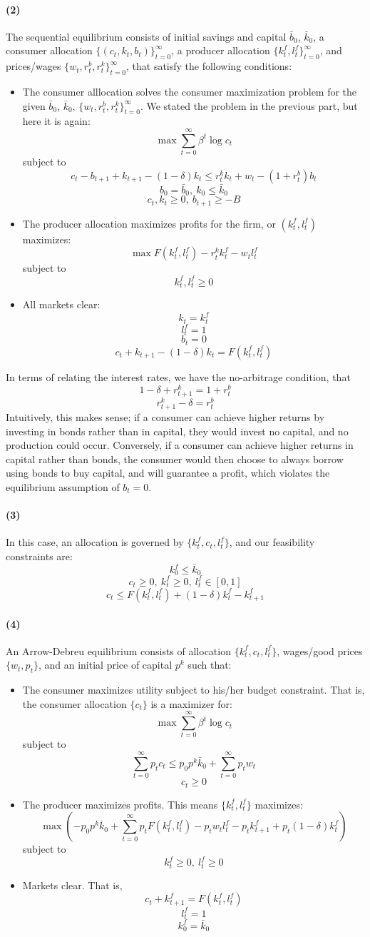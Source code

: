 \documentclass[10pt,letter]{article}
\newcommand{\problempart}[1]{\paragraph{#1}}
\begin{document}
\problempart{(2)}
The sequential equilibrium consists of initial savings and capital $\bar{b}_0$, $\bar{k}_0$, a consumer allocation $\{ (c_t, k_t, b_t) \}_{t=0}^\infty$, a producer allocation $\{ k_t^f, l_t^f \}_{t=0}^\infty$, and prices/wages $\{ w_t, r_t^b, r_t^k \}_{t=0}^\infty$, that satisfy the following conditions:
\begin{itemize}
\item The consumer alllocation solves the consumer maximization problem for the given $\bar{b}_0$, $\bar{k}_0$, $\{ w_t, r_t^b, r_t^k \}_{t=0}^\infty$. We stated the problem in the previous part, but here it is again:
\[ \max \sum_{t=0}^\infty \beta^t \log c_t\]
subject to
\[ c_t - b_{t+1} + k_{t+1} - (1-\delta) k_t \le r_t^k k_t + w_t - (1+r_t^b )b_t \]
\[ b_0 = \bar{b}_0, \ k_0 \le \bar{k}_0 \]
\[ c_t, k_t \ge 0, \ b_{t+1} \ge -B\]
\item The producer allocation maximizes profits for the firm, or $(k_t^f, l_t^f)$ maximizes:
\[ \max F(k_t^f, l_t^f) - r_t^k k_t^f - w_tl_t^f\]
subject to
\[ k_t^f, l_t^f \ge 0 \]
\item All markets clear:
\[ k_t = k_t^f \]
\[ l_t^f = 1 \]
\[ b_t = 0 \]
\[ c_t + k_{t+1} - (1-\delta) k_t = F(k_t^f, l_t^f) \]
\end{itemize}
In terms of relating the interest rates, we have the no-arbitrage condition, that
\[ 1-\delta +r^k_{t+1} = 1+ r^b_t\]
\[ r^k_{t+1} - \delta = r^b_t\]
Intuitively, this makes sense; if a consumer can achieve higher returns by investing in bonds rather than in capital, they would invest no capital, and no production could occur. Conversely, if a consumer can achieve higher returns in capital rather than bonds, the consumer would then choose to always borrow using bonds to buy capital, and will guarantee a profit, which violates the equilibrium assumption of $b_t = 0$.
\problempart{(3)} In this case, an allocation is governed by $\{ k_t^f, c_t, l_t^f \}$, and our feasibility constraints are:
\[ k_0^f \le \bar{k}_0 \]
\[ c_t \ge 0, \ k_t^f \ge 0, \ l_t^f \in [0,1] \]
\[ c_t \le F(k_t^f, l_t^f) + (1-\delta)k_t^f - k_{t+1}^f \]
\problempart{(4)} An Arrow-Debreu equilibrium consists of allocation $\{ k_t^f, c_t, l_t^f \}$, wages/good prices $\{ w_t, p_t \}$, and an initial price of capital $p^k$ such that:
\begin{itemize}
\item The consumer maximizes utility subject to his/her budget constraint. That is, the consumer allocation $\{ c_t \}$ is a maximizer for:
\[ \max \sum_{t=0}^\infty \beta^t \log c_t  \]
subject to
\[ \sum_{t=0}^\infty p_t c_t \le p_0 p^k \bar{k}_0 + \sum_{t=0}^\infty p_t w_t \]
\[ c_t \ge 0\]
\item The producer maximizes profits. This means $\{ k_t^f, l_t^f \}$ maximizes:
\[ \max \left(-p_0 p^k \bar{k}_0 + \sum_{t=0}^\infty p_t F(k_t^f, l_t^f) - p_tw_tl_t^f - p_tk^f_{t+1} + p_t(1-\delta)k^f_t \right) \]
subject to
\[ k^f_t\ge 0, \ l^f_t \ge 0  \]
\item Markets clear. That is,
\[ c_t + k^f_{t+1} = F(k^f_t, l^f_t) \]
\[ l_t^f = 1 \]
\[ k^f_0 = \bar{k}_0 \]
\end{itemize}
\end{document}
